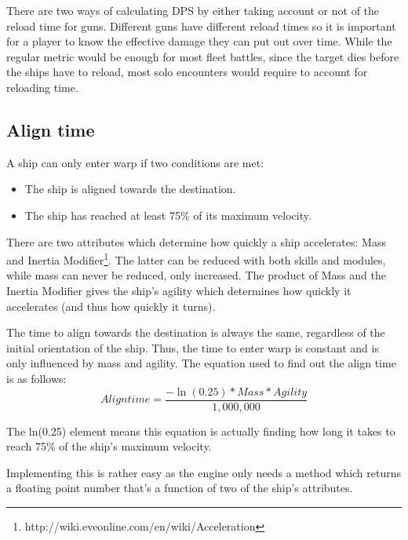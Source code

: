 There are two ways of calculating DPS by either taking account or not of the reload time for guns. Different guns have different reload times so it is important for a player to know the effective damage they can put out over time. While the regular metric would be enough for most fleet battles, since the target dies before the ships have to reload, most solo encounters would require to account for reloading time.

\subsection{Align time}
A ship can only enter warp if two conditions are met:
\begin{itemize}
\item The ship is aligned towards the destination.
\item The ship has reached at least 75\% of its maximum velocity.
\end{itemize}

There are two attributes which determine how quickly a ship accelerates: Mass and Inertia Modifier\footnote{http://wiki.eveonline.com/en/wiki/Acceleration}. The latter can be reduced with both skills and modules, while mass can never be reduced, only increased. The product of Mass and the Inertia Modifier gives the ship's agility which determines how quickly it accelerates (and thus how quickly it turns).

The time to align towards the destination is always the same, regardless of the initial orientation of the ship. Thus, the time to enter warp is constant and is only influenced by mass and agility. The equation used to find out the align time is as follows:
\begin{equation}
Align time = \frac{-\ln(0.25) * Mass * Agility}{1,000,000}
\end{equation}

The ln(0.25) element means this equation is actually finding how long it takes to reach 75\% of the ship's maximum velocity.

Implementing this is rather easy as the engine only needs a method which returns a floating point number that’s a function of two of the ship’s attributes.
